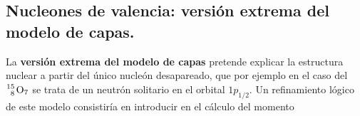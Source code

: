 \subsection{Nucleones de valencia: versión extrema del modelo de capas.}


La \textbf{versión extrema del modelo de capas} pretende explicar la estructura nuclear a partir del único nucleón desapareado, que por ejemplo en el caso del $\ce{^15_8 O_7}$ se trata de un neutrón solitario en el orbital $1p_{1/2}$. Un refinamiento lógico de este modelo consistiría en introducir en el cálculo del momento 